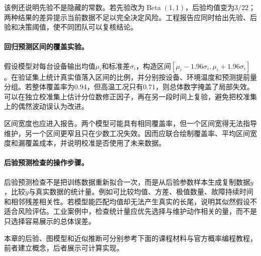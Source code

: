 该例还说明先验不是隐藏的常数。若先验改为$\operatorname{Beta}(1,1)$，后验均值变为$3/22$；两种结果的差异提示当前数据不足以完全决定风险。工程报告应同时给出先验、后验和决策阈值，使不同团队可以复核结论。

\paragraph{回归预测区间的覆盖实验。}
假设模型对每台设备输出均值$\mu_i$和标准差$\sigma_i$，构造区间$[\mu_i-1.96\sigma_i,\mu_i+1.96\sigma_i]$。在验证集上统计真实值落入区间的比例，并分别按设备、环境温度和预测提前量分组。若整体覆盖率为$0.94$，但高温工况只有$0.71$，则总体数字掩盖了局部失效。可以在独立校准集上估计分位数修正因子，再在另一段时间上复验，避免把校准集上的偶然波动误认为改进。

区间宽度也应进入报告。两个模型可能具有相同覆盖率，但一个区间宽得无法指导维护，另一个区间更窄且只在少数工况失效。因而应联合绘制覆盖率、平均区间宽度和漏覆盖成本，并说明校准是否使用了未来数据。

\paragraph{后验预测检查的操作步骤。}
后验预测检查不是把训练数据重新拟合一次，而是从后验参数样本生成复制数据$\tilde y$，比较$\tilde y$与真实数据的统计量。例如可比较均值、方差、极值数量、故障持续时间和相邻残差相关性。若模型能匹配均值却无法产生真实的长尾，说明其似然假设不适合风险评估。工业案例中，检查统计量应优先选择与维护动作相关的量，而不是只选择容易展示的总体误差。

本章的后验、图模型和近似推断可分别参考下面的课程材料与官方概率编程教程，前者建立概念，后者展示可计算实现。
